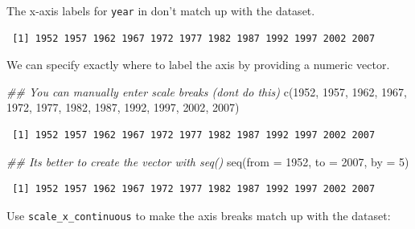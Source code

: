 \documentclass[
  letterpaper,
  DIV=11,
  numbers=noendperiod]{scrreprt}
\newenvironment{Shaded}{\begin{snugshade}}{\end{snugshade}}
\newcommand{\AttributeTok}[1]{\textcolor[rgb]{0.40,0.45,0.13}{#1}}
\newcommand{\DecValTok}[1]{\textcolor[rgb]{0.68,0.00,0.00}{#1}}
\newcommand{\DocumentationTok}[1]{\textcolor[rgb]{0.37,0.37,0.37}{\textit{#1}}}
\newcommand{\FunctionTok}[1]{\textcolor[rgb]{0.28,0.35,0.67}{#1}}
\newcommand{\NormalTok}[1]{\textcolor[rgb]{0.00,0.23,0.31}{#1}}
\newcommand{\SpecialCharTok}[1]{\textcolor[rgb]{0.37,0.37,0.37}{#1}}
\begin{document}
The x-axis labels for \texttt{year} in don't match up with the dataset.

\begin{Shaded}
\end{Shaded}

\begin{verbatim}
 [1] 1952 1957 1962 1967 1972 1977 1982 1987 1992 1997 2002 2007
\end{verbatim}

We can specify exactly where to label the axis by providing a numeric
vector.

\begin{Shaded}
\begin{Highlighting}[]
\DocumentationTok{\#\# You can manually enter scale breaks (don\textquotesingle{}t do this)}
\FunctionTok{c}\NormalTok{(}\DecValTok{1952}\NormalTok{, }\DecValTok{1957}\NormalTok{, }\DecValTok{1962}\NormalTok{, }\DecValTok{1967}\NormalTok{, }\DecValTok{1972}\NormalTok{, }\DecValTok{1977}\NormalTok{, }\DecValTok{1982}\NormalTok{, }\DecValTok{1987}\NormalTok{, }\DecValTok{1992}\NormalTok{, }\DecValTok{1997}\NormalTok{, }\DecValTok{2002}\NormalTok{, }\DecValTok{2007}\NormalTok{)}
\end{Highlighting}
\end{Shaded}

\begin{verbatim}
 [1] 1952 1957 1962 1967 1972 1977 1982 1987 1992 1997 2002 2007
\end{verbatim}

\begin{Shaded}
\begin{Highlighting}[]
\DocumentationTok{\#\# It\textquotesingle{}s better to create the vector with seq()}
\FunctionTok{seq}\NormalTok{(}\AttributeTok{from =} \DecValTok{1952}\NormalTok{, }\AttributeTok{to =} \DecValTok{2007}\NormalTok{, }\AttributeTok{by =} \DecValTok{5}\NormalTok{)}
\end{Highlighting}
\end{Shaded}

\begin{verbatim}
 [1] 1952 1957 1962 1967 1972 1977 1982 1987 1992 1997 2002 2007
\end{verbatim}

Use \texttt{scale\_x\_continuous} to make the axis breaks match up with
the dataset:
\end{document}
